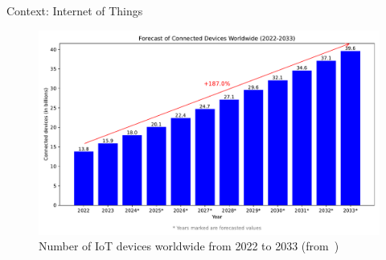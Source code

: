 \begin{frame}{Context: Internet of Things}
\begin{minipage}[c]{0.5\textwidth}
\begin{figure}
        \end{figure}
        \vspace{-15pt}
        \begin{figure}
            \centering
            \includegraphics[width=.825\textwidth]{src/1_introduction/img/iot_forecasts.pdf}
            \vspace{-5pt}
            \caption{Number of IoT devices worldwide from 2022 to 2033 (from~\cite{statista_iot})}
            \label{fig:nbr_iot}
        \end{figure}
    \end{minipage}
\end{frame}

